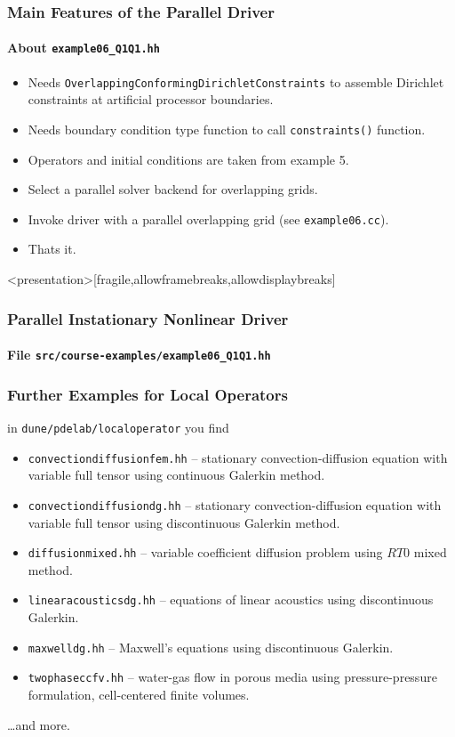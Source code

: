 \begin{frame}
\frametitle{Main Features of the Parallel Driver}
\framesubtitle{About \lstinline{example06_Q1Q1.hh}}
\begin{itemize}
\item Needs \lstinline{OverlappingConformingDirichletConstraints}
to assemble Dirichlet constraints at artificial processor boundaries.
\item Needs boundary condition type function to call \lstinline{constraints()} function.
\item Operators and initial conditions are taken from example 5.
\item Select a parallel solver backend for overlapping grids.
\item Invoke driver with a parallel overlapping grid (see \lstinline{example06.cc}).
\item Thats it.
\end{itemize}
\end{frame}

\begin{frame}<presentation>[fragile,allowframebreaks,allowdisplaybreaks]
\frametitle<presentation>{Parallel Instationary Nonlinear Driver}
\framesubtitle<presentation>{File \texttt{src/course-examples/example06\_Q1Q1.hh}}

\end{frame}

\begin{frame}
\frametitle{Further Examples for Local Operators}
in \lstinline{dune/pdelab/localoperator} you find
\begin{itemize}
\item \lstinline{convectiondiffusionfem.hh} -- stationary convection-diffusion equation with variable full tensor using
continuous Galerkin method.
\item \lstinline{convectiondiffusiondg.hh} -- stationary convection-diffusion equation with variable full tensor using discontinuous
Galerkin method.
\item \lstinline{diffusionmixed.hh} -- variable coefficient diffusion problem using $RT0$ mixed method.
\item \lstinline{linearacousticsdg.hh} -- equations of linear acoustics using discontinuous Galerkin.
\item \lstinline{maxwelldg.hh} -- Maxwell's equations using discontinuous Galerkin.
\item \lstinline{twophaseccfv.hh} -- water-gas flow in porous media using pressure-pressure formulation,
cell-centered finite volumes.
\end{itemize}
\ldots and more.
\end{frame}


\cleardoublepage
